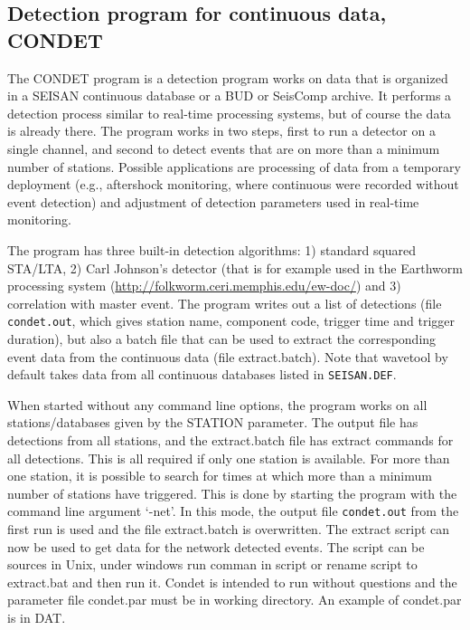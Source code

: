 
\subsection{Detection program for continuous data, CONDET}

The CONDET program is a detection program works on data that is organized in a SEISAN continuous database or a BUD or SeisComp archive. It performs a detection process similar to real-time processing systems, but of course the data is already there. The program works in two steps, first to run a detector on a single channel, and second to detect events that are on more than a minimum number of stations. Possible applications are processing of data from a temporary deployment (e.g., aftershock monitoring, where continuous were recorded without event detection) and adjustment of detection parameters used in real-time monitoring.  

The program has three built-in detection algorithms: 1) standard squared STA/LTA, 2) Carl Johnson's detector (that is for example used in the Earthworm processing system (\url{http://folkworm.ceri.memphis.edu/ew-doc/}) and 3) correlation with master event. The program writes out a list of detections (file \texttt{condet.out}, which gives station name, component code, trigger time and trigger duration), but also a batch file that can be used to extract the corresponding event data from the continuous data (file extract.batch). Note that wavetool by default takes data from all continuous databases listed in \texttt{SEISAN.DEF}.  

When started without any command line options, the program works on all stations/databases given by the STATION parameter. The output file has detections from all stations, and the extract.batch file has extract commands for all detections. This is all required if only one station is available. For more than one station, it is possible to search for times at which more than a minimum number of stations have triggered. This is done by starting the program with the command line argument `-net'. In this mode, the output file \texttt{condet.out} from the first run is used and the file extract.batch is overwritten. The extract script can now be used to get data for the network detected events. The script can be sources in Unix, under windows run comman in script or rename script to extract.bat and then run it. 
Condet is intended to run without questions and the parameter file condet.par must be in working directory. An example of condet.par is in DAT.

